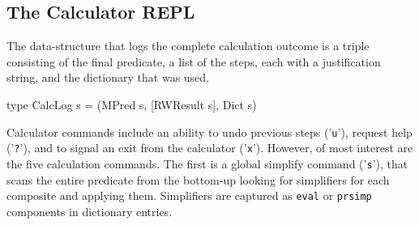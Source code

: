 \subsection{The Calculator REPL}


The data-structure that logs the complete calculation outcome
is a triple consisting of the final predicate,
a list of the steps, each with a justification string,
and the dictionary that was used.
\begin{code}
type CalcLog s = (MPred s, [RWResult s], Dict s)
\end{code}

Calculator commands include an ability to undo previous steps ('\texttt{u}'),
request help ('\texttt{?}'),
and to signal an exit from the calculator ('\texttt{x}').
However,
of most interest are the five calculation commands.
The first is a global simplify command ('\texttt{s}'),
that scans the entire predicate from the bottom-up
looking for simplifiers for each composite and applying them.
Simplifiers are captured as \texttt{eval} or \texttt{prsimp} components
in dictionary entries.

